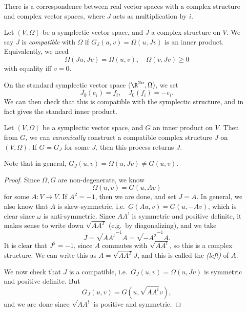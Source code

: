 \documentclass[a4paper]{article}
\begin{document}
\begin{lemma}
  There is a correspondence between real vector spaces with a complex structure and complex vector spaces, where $J$ acts as multiplication by $i$.
\end{lemma}

\begin{defi}
  Let $(V, \Omega)$ be a symplectic vector space, and $J$ a complex structure on $V$. We say $J$ is \emph{compatible} with $\Omega$ if $G_J(u, v) = \Omega(u, Jv)$ is an inner product. Equivalently, we need
  \[
    \Omega(Ju, Jv) = \Omega(u, v),\quad \Omega(v, Jv) \geq 0
  \]
  with equality iff $v = 0$.
\end{defi}

\begin{eg}
  On the standard symplectic vector space $(\R^{2n}, \Omega)$, we set
  \[
    J_0(e_i) = f_i,\quad J_0(f_i) = - e_i.
  \]
  We can then check that this is compatible with the symplectic structure, and in fact gives the standard inner product.
\end{eg}

\begin{prop}
  Let $(V, \Omega)$ be a symplectic vector space, and $G$ an inner product on $V$. Then from $G$, we can \emph{canonically} construct a compatible complex structure $J$ on $(V, \Omega)$. If $G = G_{J}$ for some $J$, then this process returns $J$.
\end{prop}

Note that in general, $G_J(u, v) = \Omega(u, Jv) \not= G(u, v)$.
\begin{proof}
  Since $\Omega, G$ are non-degenerate, we know
  \[
    \Omega(u, v) = G(u, Av)
  \]
  for some $A: V \to V$. If $A^2 = -1$, then we are done, and set $J = A$. In general, we also know that $A$ is skew-symmetric, i.e.\ $G(Au, v) = G(u, -Av)$, which is clear since $\omega$ is anti-symmetric. Since $AA^t$ is symmetric and positive definite, it makes sense to write down $\sqrt{AA^T}$ (e.g.\ by diagonalizing), and we take
  \[
    J = \sqrt{AA^t}^{-1} A = \sqrt{-A^2}^{-1} A.
  \]
  It is clear that $J^2 = -1$, since $A$ commutes with $\sqrt{AA^t}$, so this is a complex structure. We can write this as $A = \sqrt{AA^T} J$, and this is called the \emph{(left)}  of $A$.

  We now check that $J$ is a compatible, i.e.\ $G_J(u, v) = \Omega(u, Jv)$ is symmetric and positive definite. But
  \[
    G_J(u, v) = G(u, \sqrt{AA^t}v),
  \]
  and we are done since $\sqrt{AA^t}$ is positive and symmetric.
\end{proof}
\end{document}
